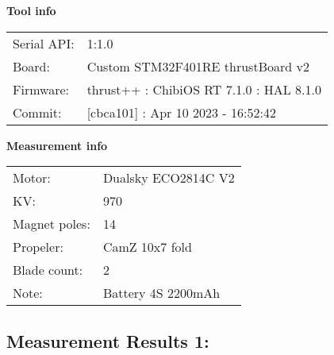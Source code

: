 \documentclass[10pt]{article}
\begin{document}
\noindent
{\large \bf Tool info}
\vspace{3mm}

\noindent
\begin{tabular}{ll}
Serial API:  & 1:1.0\\ 
Board:       & Custom STM32F401RE thrustBoard v2\\ 
Firmware:    & thrust++ : ChibiOS RT 7.1.0 : HAL 8.1.0\\ 
Commit:      & [cbca101] : Apr 10 2023 - 16:52:42
\end{tabular}
\vspace{3mm}

\noindent
{\large \bf Measurement info}
\vspace{3mm}

\noindent
\begin{tabular}{ll}
Motor:        & Dualsky ECO2814C V2\\ 
KV:           & 970\\ 
Magnet poles: & 14\\ 
Propeler:     & CamZ 10x7 fold\\ 
Blade count:  & 2\\ 
Note:         & Battery 4S 2200mAh
\end{tabular}

\vspace{3mm}


\subsection*{\large \bf Measurement Results 1:}
\end{document}

